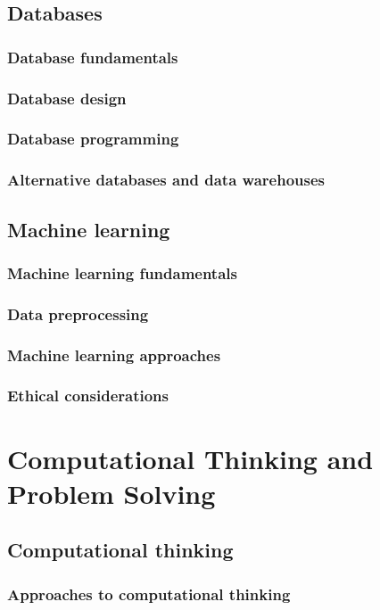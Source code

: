 \subsection{Databases}
\subsubsection{Database fundamentals}
\subsubsection{Database design}
\subsubsection{Database programming}
\subsubsection{Alternative databases and data warehouses}
\subsection{Machine learning}
\subsubsection{Machine learning fundamentals}
\subsubsection{Data preprocessing}
\subsubsection{Machine learning approaches}
\subsubsection{Ethical considerations}

\newpage
\section{Computational Thinking and Problem Solving}
\subsection{Computational thinking}
\subsubsection{Approaches to computational thinking}
